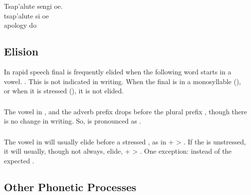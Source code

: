 \begin{interlin}
\glll Tsap'alute sengi oe. \\
      tsap'alute si oe \\
      apology do  \\
\end{interlin}


\subsection{Elision} In rapid speech final  is frequently elided
when the following word starts in a vowel.  .  This is not indicated in writing.
When the final  is in a monosyllable (), or when it is
stressed (), it is not elided.

\subsubsection{} The vowel  in ,  and the adverb
prefix  drops before the plural prefix , though there is
no change in writing.  So,   is pronounced as
. \label{l-and-s:elision-i}

\subsubsection{} The vowel in  will usually elide before a
stressed , as in  +  > . If the 
is unstressed, it will usually, though not always, elide,  +
 > . One exception:  instead of the
expected .

\subsection{Other Phonetic Processes}

